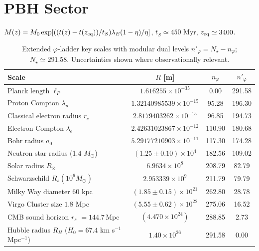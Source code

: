 \documentclass[aps,prd,reprint,onecolumn,nofootinbib]{revtex4-2}
\begin{document}
\section{PBH Sector}
$M(z)=M_0\exp[((t(z)-t(z_{\rm eq}))/t_S)\lambda_E(1-\eta)/\eta]$, $t_S\simeq 450$ Myr, $z_{\rm eq}\simeq 3400$.


\begin{table}[t]
\caption{Extended $\varphi$-ladder key scales with modular dual levels $n'_\varphi=N_\star-n_\varphi$; $N_\star\simeq 291.58$. Uncertainties shown where observationally relevant.}
\centering
\setlength{\tabcolsep}{5pt}
\renewcommand{\arraystretch}{1.12}
\begin{tabularx}{\textwidth}{Y c c c}
\toprule
\textbf{Scale} & $R$ [m] & $n_\varphi$ & $n'_\varphi$ \\
\midrule
Planck length $\ell_P$ & $1.616255\times 10^{-35}$ & 0.00 & 291.58 \\
Proton Compton $\lambda_p$ & $1.32140985539\times 10^{-15}$ & 95.28 & 196.30 \\
Classical electron radius $r_e$ & $2.8179403262\times 10^{-15}$ & 96.85 & 194.73 \\
Electron Compton $\lambda_e$ & $2.42631023867\times 10^{-12}$ & 110.90 & 180.68 \\
Bohr radius $a_0$ & $5.29177210903\times 10^{-11}$ & 117.30 & 174.28 \\
Neutron star radius (1.4 $M_\odot$)\footnotemark[1] & $(1.25\pm0.10)\times 10^{4}$ & 182.56 & 109.02 \\
Solar radius $R_\odot$ & $6.9634\times 10^{8}$ & 208.79 & 82.79 \\
Schwarzschild $R_s(10^6 M_\odot)$ & $2.953339\times 10^{9}$ & 211.79 & 79.79 \\
Milky Way diameter $60$ kpc\footnotemark[2] & $(1.85\pm0.15)\times 10^{21}$ & 262.80 & 28.78 \\
Virgo Cluster size $1.8$ Mpc\footnotemark[3] & $(5.55\pm0.62)\times 10^{22}$ & 275.06 & 16.52 \\
CMB sound horizon $r_s$ $=144.7\,$Mpc\footnotemark[4] & $(4.470\times 10^{24})$ & 288.85 & 2.73 \\
Hubble radius $R_H$ ($H_0=67.4$ km s$^{-1}$ Mpc$^{-1}$)\footnotemark[5] & $1.40\times 10^{26}$ & 291.58 & 0.00 \\
\bottomrule
\end{tabularx}

\vspace{0.3em}
\end{table}
\end{document}
